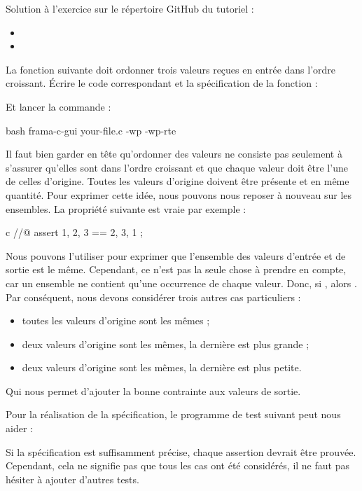 \begin{Information}
  Solution à l'exercice sur le répertoire GitHub du tutoriel :
  \begin{itemize}
    \item {}
    \item {}
  \end{itemize}
\end{Information}




La fonction suivante doit ordonner trois valeurs reçues en entrée dans
l'ordre croissant. Écrire le code correspondant et la spécification de la
fonction :



Et lancer la commande :


\begin{CodeBlock}{bash}
frama-c-gui your-file.c -wp -wp-rte
\end{CodeBlock}


Il faut bien garder en tête qu'ordonner des valeurs ne consiste pas seulement
à s'assurer qu'elles sont dans l'ordre croissant et que chaque valeur doit
être l'une de celles d'origine. Toutes les valeurs d'origine doivent être
présente et en même quantité. Pour exprimer cette idée, nous pouvons nous
reposer à nouveau sur les ensembles. La propriété suivante est vraie par
exemple :


\begin{CodeBlock}{c}
//@ assert { 1, 2, 3 } == { 2, 3, 1 };
\end{CodeBlock}


Nous pouvons l'utiliser pour exprimer que l'ensemble des valeurs d'entrée et
de sortie est le même. Cependant, ce n'est pas la seule chose à prendre en
compte, car un ensemble ne contient qu'une occurrence de chaque valeur. Donc,
si , alors .
Par conséquent, nous devons considérer trois autres cas particuliers :
\begin{itemize}
\item toutes les valeurs d'origine sont les mêmes ;
\item deux valeurs d'origine sont les mêmes, la dernière est plus grande ;
\item deux valeurs d'origine sont les mêmes, la dernière est plus petite.
\end{itemize}


Qui nous permet d'ajouter la bonne contrainte aux valeurs de sortie.


Pour la réalisation de la spécification, le programme de test suivant peut
nous aider :




Si la spécification est suffisamment précise, chaque assertion devrait être
prouvée. Cependant, cela ne signifie pas que tous les cas ont été considérés,
il ne faut pas hésiter à ajouter d'autres tests.


